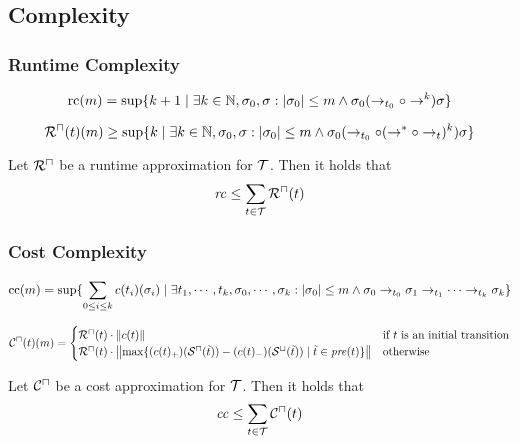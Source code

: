 \subsection{Complexity}

\subsubsection{Runtime Complexity}

\begin{definition}
	\[ \text{rc}(m) = \sup \lbrace  k + 1 \mid \exists k \in \mathbb{N}, \sigma_0, \sigma: \left|\sigma_0\right| \leq m \wedge \sigma_0 (\rightarrow_{t_0} \circ \rightarrow^k) \sigma  \rbrace \]
\end{definition}

\begin{definition}
	\[ {\mathcal{R}^\sqcap}(t)(m) \geq \sup \lbrace  k \mid \exists k \in \mathbb{N}, \sigma_0, \sigma: \left|\sigma_0\right| \leq m \wedge \sigma_0 (\rightarrow_{t_0} \circ (\rightarrow^* \circ \rightarrow_t)^k) \sigma  \rbrace \]
\end{definition}

\begin{theorem}
	Let ${\mathcal{R}^\sqcap}$ be a runtime approximation for $\mathcal{T}$.
	Then it holds that 
	\[ \mathit{rc} \leq \sum_{t \in \mathcal{T}}{\mathcal{R}^\sqcap}(t) \]
\end{theorem}

\subsubsection{Cost Complexity}

\begin{definition}
  \[ \text{cc}(m) = \sup \lbrace  \sum_{0 \leq i \leq k} c(t_i)(\sigma_i) \mid \exists t_1, \cdots, t_k, \sigma_0, \cdots, \sigma_k: \left|\sigma_0\right| \leq m \wedge
    \sigma_0 \rightarrow_{t_0} \sigma_1 \rightarrow_{t_1} \dots \rightarrow_{t_k} \sigma_k  \rbrace
  \]
\end{definition}

\begin{definition}
  \[ {\mathcal{C}^\sqcap}(t)(m) =
  \begin{cases}
    {\mathcal{R}^\sqcap}(t) \cdot \left\Vert c(t)\right\Vert & \text{if } t \text{ is an initial transition} \\
    {\mathcal{R}^\sqcap}(t) \cdot \left\Vert\max \lbrace (c(t)_+)({\mathcal{S}^\sqcap}(\tilde{t})) - (c(t)_-)({\mathcal{S}^\sqcup}(\tilde{t})) \mid \tilde{t} \in \mathit{pre}(t) \rbrace\right\Vert & \text{otherwise}
  \end{cases}
  \]
\end{definition}

\begin{theorem}
	Let ${\mathcal{C}^\sqcap}$ be a cost approximation for $\mathcal{T}$.
	Then it holds that 
	\[ \mathit{cc} \leq \sum_{t \in \mathcal{T}} {\mathcal{C}^\sqcap}(t) \]
\end{theorem}

